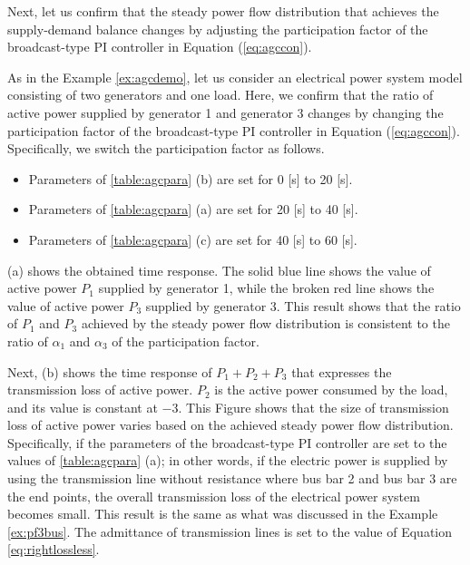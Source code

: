 \documentclass[graybox, envcountchap]{svmult}
\begin{document}
Next, let us confirm that the steady power flow distribution that achieves the supply-demand balance changes by adjusting the participation factor of the broadcast-type PI controller in Equation  (\ref{eq:agccon}).

\begin{例}\label{ex:pfvary}
As in the Example \ref{ex:agcdemo}, let us consider an electrical power system model consisting of two generators and one load.
Here, we confirm that the ratio of active power supplied by generator 1 and generator 3 changes by changing the participation factor of the broadcast-type PI controller in Equation (\ref{eq:agccon}).
Specifically, we switch the participation factor as follows.

\begin{itemize}
\item Parameters of \ref{table:agcpara} (b) are set for 0 [s] to 20 [s].
\item Parameters of \ref{table:agcpara} (a) are set for 20 [s] to 40 [s].
\item Parameters of \ref{table:agcpara} (c) are set for 40 [s] to 60 [s].
\end{itemize}

(a) shows the obtained time response.
The solid blue line shows the value of active power $P_1$ supplied by generator 1, while the broken red line shows the value of active power $P_3$ supplied by generator 3.
This result shows that the ratio of $P_1$ and $P_3$ achieved by the steady power flow distribution is consistent to the ratio of $\alpha_1$ and $\alpha_3$ of the participation factor.

Next, (b) shows the time response of $P_1+P_2+P_3$ that expresses the transmission loss of active power.
$P_2$ is the active power consumed by the load, and its value is constant at $-3$.
This Figure shows that the size of transmission loss of active power varies based on the achieved steady power flow distribution.
Specifically, if the parameters of the broadcast-type PI controller are set to the values of \ref{table:agcpara} (a); in other words, if the electric power is supplied by using the transmission line without resistance where bus bar 2 and bus bar 3 are the end points, the overall transmission loss of the electrical power system becomes small. This result is the same as what was discussed in the Example \ref{ex:pf3bus}. The admittance of transmission lines is set to the value of Equation \ref{eq:rightlossless}.
\end{例}
\end{document}
